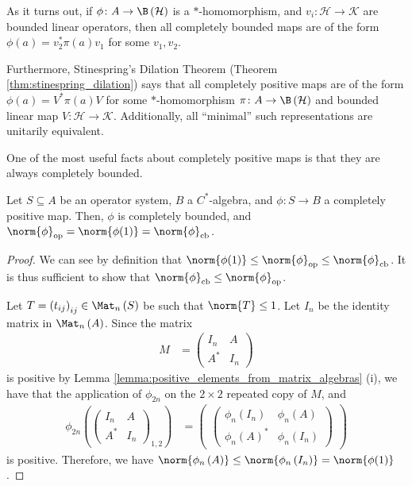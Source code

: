\begin{remark}
  As it turns out, if $\phi\colon A\rightarrow \B\left( \mathcal{H} \right)$ is a $\ast$-homomorphism, and $v_i\colon \mathcal{H}\rightarrow \mathcal{K}$ are bounded linear operators, then all completely bounded maps are of the form $\phi\left( a \right) = v_2^{\ast}\pi(a)v_1$ for some $v_1,v_2$.\newline

  Furthermore, Stinespring's Dilation Theorem (Theorem \ref{thm:stinespring_dilation}) says that all completely positive maps are of the form $\phi\left( a \right) = V^{\ast}\pi(a)V$ for some $\ast$-homomorphism $\pi\colon A\rightarrow \B\left( \mathcal{H} \right)$ and bounded linear map $V\colon \mathcal{H}\rightarrow \mathcal{K}$. Additionally, all ``minimal'' such representations are unitarily equivalent.
\end{remark}
One of the most useful facts about completely positive maps is that they are always completely bounded.
\begin{proposition}
  Let $S\subseteq A$ be an operator system, $B$ a $C^{\ast}$-algebra, and $\phi\colon S\rightarrow B$ a completely positive map. Then, $\phi$ is completely bounded, and $\norm{\phi}_{\op} = \norm{\phi(1)} = \norm{\phi}_{\cb}$.
\end{proposition}
\begin{proof}
  We can see by definition that $\norm{\phi(1)}\leq \norm{\phi}_{\op}\leq \norm{\phi}_{\cb}$. It is thus sufficient to show that $\norm{\phi}_{\cb}\leq \norm{\phi}_{\op}$.\newline

  Let $T = \left( t_{ij} \right)_{ij}\in \Mat_n\left( S \right)$ be such that $\norm{T}\leq 1$. Let $I_n$ be the identity matrix in $\Mat_n\left( A \right)$. Since the matrix
  \begin{align*}
    M &= \begin{pmatrix}I_n & A \\ A^{\ast} & I_n\end{pmatrix}
  \end{align*}
  is positive by Lemma \ref{lemma:positive_elements_from_matrix_algebras} (i), we have that the application of $\phi_{2n}$ on the $2\times 2$ repeated copy of $M$, and 
  \begin{align*}
    \phi_{2n}\left( \begin{pmatrix}I_n & A \\ A^{\ast} & I_n\end{pmatrix}_{1,2} \right) &= \begin{pmatrix} \begin{pmatrix}\phi_n\left( I_n \right) & \phi_n\left( A \right) \\ \phi_n\left( A \right)^{\ast} & \phi_n\left( I_n \right)\end{pmatrix}\end{pmatrix}
  \end{align*}
  is positive. Therefore, we have $\norm{\phi_n\left( A \right)}\leq \norm{\phi_n\left( I_n \right)} = \norm{\phi(1)}$.
\end{proof}
